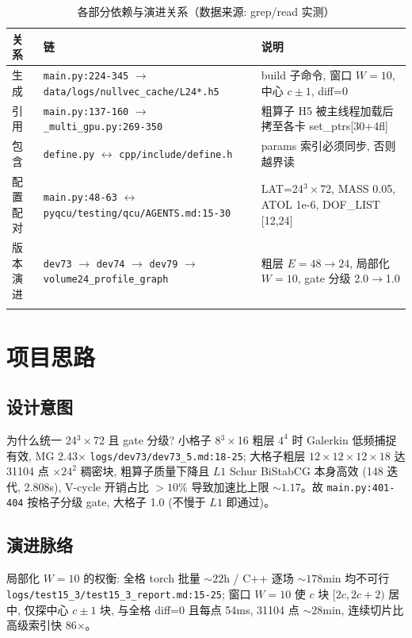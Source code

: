 \documentclass[UTF8]{ctexart}
\begin{document}
\begin{xltabular}{\textwidth}{llX}
\toprule
关系 & 链 & 说明 \\
\midrule
\endhead
生成 & \texttt{\nolinkurl{main.py:224-345}} $\to$ \texttt{\nolinkurl{data/logs/nullvec_cache/L24*.h5}} & build 子命令, 窗口 $W=10$, 中心 $c\pm1$, diff=0 \\
引用 & \texttt{\nolinkurl{main.py:137-160}} $\to$ \texttt{\nolinkurl{_multi_gpu.py:269-350}} & 粗算子 H5 被主线程加载后拷至各卡 set\_ptrs[30+4fl] \\
包含 & \texttt{\nolinkurl{define.py}} $\leftrightarrow$ \texttt{\nolinkurl{cpp/include/define.h}} & params 索引必须同步, 否则越界读 \\
配置配对 & \texttt{\nolinkurl{main.py:48-63}} $\leftrightarrow$ \texttt{\nolinkurl{pyqcu/testing/qcu/AGENTS.md:15-30}} & LAT=24$^3\times$72, MASS 0.05, ATOL 1e-6, DOF\_LIST [12,24] \\
版本演进 & \texttt{\nolinkurl{dev73}} $\to$ \texttt{\nolinkurl{dev74}} $\to$ \texttt{\nolinkurl{dev79}} $\to$ \texttt{\nolinkurl{volume24_profile_graph}} & 粗层 $E=48\to24$, 局部化 $W=10$, gate 分级 2.0$\to$1.0 \\
\bottomrule
\caption{各部分依赖与演进关系（数据来源: grep/read 实测）}
\end{xltabular}

\section{项目思路}
\subsection{设计意图}
\textcolor{idea}{为什么统一 24$^3\times$72 且 gate 分级?} 小格子 8$^3\times$16 粗层 $4^4$ 时 Galerkin 低频捕捉有效, MG 2.43$\times$ \textcolor{evidence}{\texttt{\nolinkurl{logs/dev73/dev73_5.md:18-25}}}; 大格子粗层 $12\times12\times12\times18$ 达 31104 点 $\times 24^2$ 稠密块, 粗算子质量下降且 $L1$ Schur BiStabCG 本身高效 (148 迭代, 2.808s), V-cycle 开销占比 $>10\%$ 导致加速比上限 $\sim1.17$。故 \texttt{\nolinkurl{main.py:401-404}} 按格子分级 gate, 大格子 1.0 (不慢于 $L1$ 即通过)。

\subsection{演进脉络}
\textcolor{idea}{局部化 $W=10$ 的权衡:} 全格 torch 批量 $\sim22$h / C++ 逐场 $\sim178$min 均不可行 \textcolor{evidence}{\texttt{\nolinkurl{logs/test15_3/test15_3_report.md:15-25}}}; 窗口 $W=10$ 使 $c$ 块 $[2c,2c+2)$ 居中, 仅探中心 $c\pm1$ 块, 与全格 diff=0 且每点 54ms, 31104 点 $\sim28$min, 连续切片比高级索引快 86$\times$。
\end{document}
